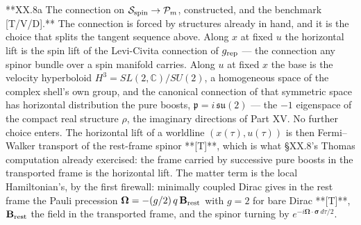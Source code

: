 **XX.8a The connection on $\mathcal S_{\rm spin}\to\mathcal P_m$, constructed, and the benchmark [T/V/D].** The connection is forced by structures already in hand, and it is the choice that splits the tangent sequence above. Along $x$ at fixed $u$ the horizontal lift is the spin lift of the Levi-Civita connection of $g_{\rm rep}$ — the connection any spinor bundle over a spin manifold carries. Along $u$ at fixed $x$ the base is the velocity hyperboloid $H^3 = SL(2,\mathbb C)/SU(2)$, a homogeneous space of the complex shell's own group, and the canonical connection of that symmetric space has horizontal distribution the pure boosts, $\mathfrak p = i\,\mathfrak{su}(2)$ — the $-1$ eigenspace of the compact real structure $\rho$, the imaginary directions of Part XV. No further choice enters. The horizontal lift of a worldline $(x(\tau),u(\tau))$ is then Fermi–Walker transport of the rest-frame spinor **[T]**, which is what §XX.8's Thomas computation already exercised: the frame carried by successive pure boosts in the transported frame is the horizontal lift. The matter term is the local Hamiltonian's, by the first firewall: minimally coupled Dirac gives in the rest frame the Pauli precession $\boldsymbol\Omega = -(g/2)\,q\,\mathbf B_{\rm rest}$ with $g = 2$ for bare Dirac **[T]**, $\mathbf B_{\rm rest}$ the field in the transported frame, and the spinor turning by $e^{-i\boldsymbol\Omega\cdot\boldsymbol\sigma\,d\tau/2}$.

